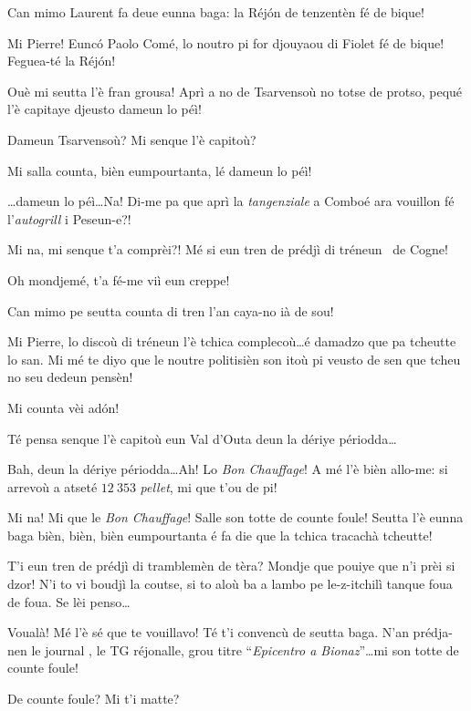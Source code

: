 \begin{drama}
\Pierrespeaks Can mimo Laurent fa deue eunna baga: la Réj\'on de tenzentèn fé de bique!

\Laurentspeaks Mi Pierre! Eunc\'o Paolo Comé, lo noutro pi for djou\-yaou di Fiolet fé de bique! Feguea-té la Réj\'on!

\Pierrespeaks Ouè mi seutta l'è fran grousa! Aprì a no de Tsarvensoù no totse de protso, pequé l'è capitaye djeusto dameun lo péì!

\Laurentspeaks Dameun Tsarvensoù? Mi senque l'è capitoù?

\Pierrespeaks Mi salla counta, bièn eumpourtanta, lé dameun lo péì!

\Laurentspeaks \ldots dameun lo péì\ldots Na! Di-me pa que aprì la \textit{tangenziale} a Comboé ara vouillon fé l'\textit{autogrill} i Peseun-e?!

\Pierrespeaks Mi na, mi senque t'a comprèi?! Mé si eun tren de prédjì di tréneun \tren\ de Cogne!

\Laurentspeaks Oh mondjemé, t'a fé-me viì eun creppe!

\Pierrespeaks Can mimo pe seutta counta di tren l'an caya-no ià de sou! 

\Laurentspeaks Mi Pierre, lo discoù di tréneun l'è tchica complecoù\ldots é damadzo que pa tcheutte lo san. Mi mé te diyo que le noutre politisièn son itoù pi veusto de sen que tcheu no seu dedeun pensèn! 

\Pierrespeaks Mi counta vèi ad\'on!

\Laurentspeaks Té pensa senque l'è capitoù eun Val d'Outa deun la dériye périodda\ldots

\Pierrespeaks Bah, deun la dériye périodda\ldots Ah! Lo \textit{Bon Chauffage}! A mé l'è bièn allo-me: si arrevoù a atseté $12\ 353$ \textit{pellet}, mi que t'ou de pi!

\Laurentspeaks Mi na! Mi que le \textit{Bon Chauffage}! Salle son totte de counte foule! Seutta l'è eunna baga bièn, bièn, bièn eumpourtanta é fa die que la tchica tracachà tcheutte!

\Pierrespeaks T'i eun tren de prédjì di tramblemèn de tèra? Mondje que pouiye que n'i prèi si dzor! N'i to vi boudjì la coutse, si to aloù ba a lambo pe le-z-itchilì tanque foua de foua. Se lèi penso\ldots

\Laurentspeaks Voualà! Mé l'è sé que te vouillavo! Té t'i convencù de seutta baga. N'an prédja-nen le journal \journal , le TG réjonalle, grou titre ``\textit{Epicentro a Bionaz}''\ldots mi son totte de counte foule!

\Pierrespeaks De counte foule? Mi t'i matte?


\end{drama}
